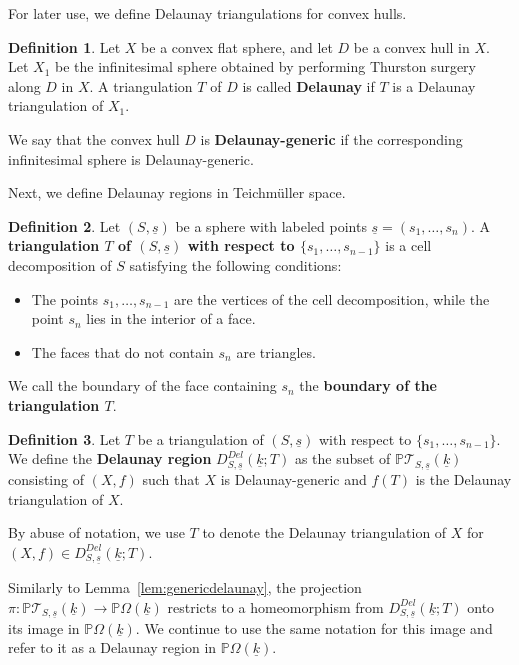 \documentclass{compositio}
\numberwithin{equation}{section}
\numberwithin{figure}{section}
\theoremstyle{definition}
\newtheorem{definition}{Definition}[section]
\theoremstyle{plain}
\begin{document}
{For later use, we define Delaunay triangulations  for convex hulls.
\begin{definition}\label{def:delaunayforconvexhull}
    Let $X$ be a convex flat sphere, and let $D$ be a convex hull in $X$.
    Let $X_1$ be the infinitesimal sphere obtained by performing Thurston surgery along $D$ in $X$.
    A triangulation $T$ of $D$ is called \textbf{Delaunay} if $T$ is a Delaunay triangulation of $X_1$.

    We say that the convex hull $D$ is \textbf{Delaunay-generic} if the corresponding infinitesimal sphere is Delaunay-generic.
\end{definition}

Next, we define Delaunay regions in Teichm\"uller space.
\begin{definition}
Let $(S, \underline{s})$ be a sphere with labeled points $\underline{s} = (s_1, \ldots, s_n)$. A \textbf{triangulation $T$ of $(S, \underline{s})$ with respect to $\{s_1, \ldots, s_{n-1}\}$} is a cell decomposition of $S$ satisfying the following conditions:
\begin{itemize}
    \item The points $s_1, \ldots, s_{n-1}$ are the vertices of the cell decomposition, while the point $s_n$ lies in the interior of a face.
    \item The faces that do not contain $s_n$ are triangles.
\end{itemize}
We call the boundary of the face containing $s_n$ the \textbf{boundary of the triangulation $T$}.
\end{definition}

\begin{definition}
    Let $T$ be a triangulation of $(S, \underline{s})$ with respect to $\{s_1, \ldots, s_{n-1}\}$. We define the \textbf{Delaunay region} $D_{S,\underline{s}}^{Del}(\underline{k};T)$ as the subset of $\mathbb{P}\mathcal{T}_{S, \underline{s}}(\underline{k})$ consisting of $(X,f)$ such that $X$ is Delaunay-generic and $f(T)$ is the Delaunay triangulation of $X$.
\end{definition} 
By abuse of notation, we use $T$ to denote the Delaunay triangulation of $X$ for $(X, f) \in D_{S,\underline{s}}^{Del}(\underline{k};T)$.

Similarly to Lemma~\ref{lem:genericdelaunay}, the projection $\pi: \mathbb{P}\mathcal{T}_{S, \underline{s}}(\underline{k}) \to \mathbb{P}\Omega(\underline{k})$ restricts to a homeomorphism from $D_{S,\underline{s}}^{Del}(\underline{k};T)$ onto its image in $\mathbb{P}\Omega(\underline{k})$. We continue to use the same notation for this image and refer to it as a Delaunay region in $\mathbb{P}\Omega(\underline{k})$.

}
\end{document}

